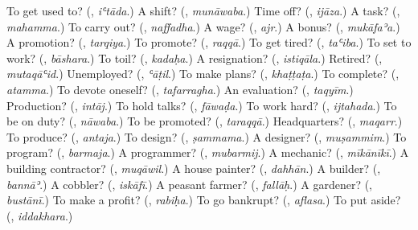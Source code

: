\begin{tcolorbox}[breakable,colback=teal!4,colframe=teal!35!black,title={Before you move on}]
To get used to? (\textbf{}, \emph{iʿtāda}.) A shift? (\textbf{}, \emph{munāwaba}.) Time off? (\textbf{}, \emph{ijāza}.) A task? (\textbf{}, \emph{mahamma}.) To carry out? (\textbf{}, \emph{naffadha}.) A wage? (\textbf{}, \emph{ajr}.) A bonus? (\textbf{}, \emph{mukāfaʾa}.) A promotion? (\textbf{}, \emph{tarqiya}.) To promote? (\textbf{}, \emph{raqqā}.) To get tired? (\textbf{}, \emph{taʿiba}.) To set to work? (\textbf{}, \emph{bāshara}.) To toil? (\textbf{}, \emph{kadaḥa}.) A resignation? (\textbf{}, \emph{istiqāla}.) Retired? (\textbf{}, \emph{mutaqāʿid}.) Unemployed? (\textbf{}, \emph{ʿāṭil}.) To make plans? (\textbf{}, \emph{khaṭṭaṭa}.) To complete? (\textbf{}, \emph{atamma}.) To devote oneself? (\textbf{}, \emph{tafarragha}.) An evaluation? (\textbf{}, \emph{taqyīm}.) Production? (\textbf{}, \emph{intāj}.) To hold talks? (\textbf{}, \emph{fāwaḍa}.) To work hard? (\textbf{}, \emph{ijtahada}.) To be on duty? (\textbf{}, \emph{nāwaba}.) To be promoted? (\textbf{}, \emph{taraqqā}.) Headquarters? (\textbf{}, \emph{maqarr}.) To produce? (\textbf{}, \emph{antaja}.) To design? (\textbf{}, \emph{ṣammama}.) A designer? (\textbf{}, \emph{muṣammim}.) To program? (\textbf{}, \emph{barmaja}.) A programmer? (\textbf{}, \emph{mubarmij}.) A mechanic? (\textbf{}, \emph{mīkānīkī}.) A building contractor? (\textbf{}, \emph{muqāwil}.) A house painter? (\textbf{}, \emph{dahhān}.) A builder? (\textbf{}, \emph{bannāʾ}.) A cobbler? (\textbf{}, \emph{iskāfī}.) A peasant farmer? (\textbf{}, \emph{fallāḥ}.) A gardener? (\textbf{}, \emph{bustānī}.) To make a profit? (\textbf{}, \emph{rabiḥa}.) To go bankrupt? (\textbf{}, \emph{aflasa}.) To put aside? (\textbf{}, \emph{iddakhara}.)
\end{tcolorbox}
